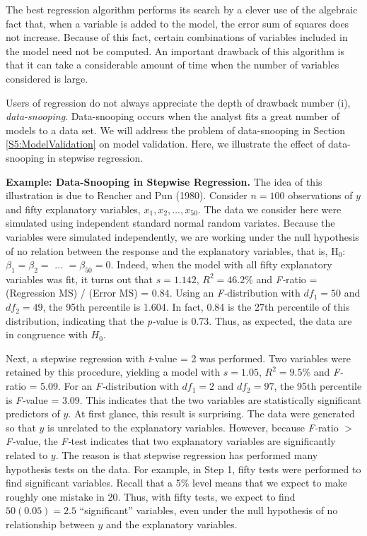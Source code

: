 The best regression algorithm performs its search by a clever use of
the algebraic fact that, when a variable is added to the model, the
error sum of squares does not increase. Because of this fact,
certain combinations of variables included in the model need not be
computed. An important drawback of this algorithm is that it can
take a considerable amount of time when the number of variables
considered is large.

Users of regression do not always appreciate the depth of drawback
number (i), \textit{data-snooping}. Data-snooping occurs when the
analyst fits a great number of models to a data set. We will address
the problem of data-snooping in Section \ref{S5:ModelValidation} on
model validation. Here, we illustrate the effect of data-snooping in
stepwise regression.

\linejed

\textbf{Example: Data-Snooping in Stepwise
Regression.} The
idea of this illustration is due to Rencher and Pun (1980). Consider
$n=100$ observations of $y$ and fifty explanatory variables, $x_1,
x_2, \ldots,x_{50}$. The data we consider here were simulated using
independent standard normal random variates. Because the variables
were simulated independently, we are working under the null
hypothesis of no relation between the response and the explanatory
variables, that is, H$_0$: $\beta_1=\beta_2=$ $\ldots$
$=\beta_{50}=0$. Indeed, when the model with all
fifty explanatory variables was fit, it turns out that $s=1.142$, $%
R^2=46.2\%$ and \textit{F-}ratio = (Regression MS) / (Error MS) =
0.84. Using an \textit{F-}distribution with $df_1=50$ and $df_2=49$,
the 95th percentile is 1.604. In fact, 0.84 is the 27th percentile
of this distribution, indicating that the \textit{p-}value is 0.73.
Thus, as expected, the data are in congruence with $H_0$.

Next, a stepwise regression with \textit{t}-value = 2 was performed. Two
variables were retained by this procedure, yielding a model with $s=1.05$, $%
R^2=9.5\%$ and \textit{F-}ratio = 5.09. For an
\textit{F-}distribution with $df_1=2$ and $df_2=97$, the 95th
percentile is \textit{F-}value = 3.09. This indicates that the two
variables are statistically significant predictors of $y$. At first
glance, this result is surprising. The data were generated so
that $y$ is unrelated to the explanatory variables. However, because \textit{%
F-}ratio $>$ \textit{F-}value, the \textit{F-}test indicates that
two explanatory variables are significantly related to $y$. The
reason is that stepwise regression has performed many hypothesis
tests on the data. For example, in Step 1, fifty tests were
performed to find significant variables. Recall that a 5\% level
means that we expect to make roughly one mistake in 20. Thus, with
fifty tests, we expect to find $50(0.05)=2.5$ ``significant''
variables, even under the null hypothesis of no relationship between
$y$ and the explanatory variables.

